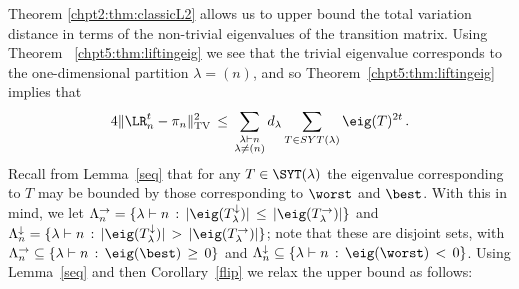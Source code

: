 \documentclass[11pt]{report}
\begin{document}
Theorem \ref{chpt2:thm:classicL2} allows us to upper bound the total 
variation distance in terms of the non-trivial eigenvalues of the 
transition matrix. Using Theorem~		\ref{chpt5:thm:liftingeig} we see that 
the trivial 
eigenvalue corresponds to the one-dimensional partition $\lambda=(n)$, and 
so Theorem~\ref{chpt5:thm:liftingeig} implies that 
\begin{eqnarray}
4\lVert \LR^{t}_{n} -\pi_{n} \rVert_{\textnormal{TV}}^{2}\,\le\, 
\sum_{\substack{\lambda\vdash n\\\lambda \neq (n)}} 
d_{\lambda} \sum_{T \in 
	SYT(\lambda)} 
\eig(T)^{2t} \,. \label{eqn:UB_start}
\end{eqnarray}
Recall from Lemma~\ref{seq} that for any $T \in \SYT(\lambda)$ the 
eigenvalue corresponding to $T$ may be bounded by those corresponding to 
$\worst$ and $\best$. With this in mind, we let $\Lambda_n^\rightarrow = 
\{\lambda\vdash n\,:\, |\eig(T_\lambda^\downarrow)|\,\le\, 
|\eig(T_\lambda^\rightarrow)|\}$ and $\Lambda_n^\downarrow = 
\{\lambda\vdash n\,:\, |\eig(T_\lambda^\downarrow)|\,>\, 
|\eig(T_\lambda^\rightarrow)|\}$; note that these are disjoint sets, with 
$\Lambda_n^\rightarrow \subseteq \{\lambda\vdash n\,:\, \eig(\best) 
\,\ge\,0 \}$ and $\Lambda_n^\downarrow \subseteq \{\lambda\vdash n\,:\, 
\eig(\worst) \,<\,0 \}$. Using Lemma~\ref{seq} and then 
Corollary~\ref{flip} we relax the upper bound as follows:
\end{document}
